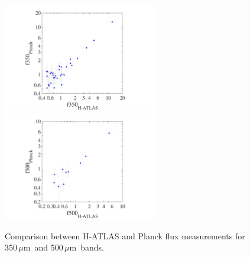 \documentclass[a4paper,fleqn,usenatbib, twocolumn]{aastex61}
\def\mic{\,$\mu $m}
\begin{document}

\begin{figure}
  \includegraphics[width=0.6\textwidth, trim=40mm .0mm 0.0mm .0mm, clip=True]{planck_comp350}
  \includegraphics[width=0.6\textwidth, trim=40mm .0mm 0.0mm .0mm, clip=True]{planck_comp500}
  \caption{Comparison between H-ATLAS and Planck flux measurements for
    350\mic\ and 500\mic\ bands.}\label{fig:planck}
\end{figure}
\end{document}
